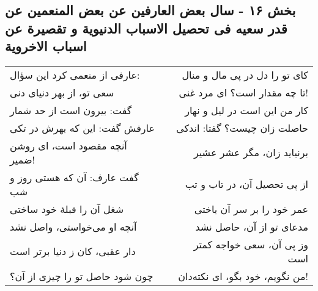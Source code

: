 \begin{center}
\section*{بخش ۱۶ - سال بعض العارفین عن بعض المنعمین عن قدر سعیه فی تحصیل الاسباب الدنیویة و تقصیرة عن اسباب الاخرویة}
\label{sec:016}
\begin{longtable}{l p{0.5cm} r}
عارفی از منعمی کرد این سؤال:
&&
کای تو را دل در پی مال و منال
\\
سعی تو، از بهر دنیای دنی
&&
تا چه مقدار است؟ ای مرد غنی!
\\
گفت: بیرون است از حد شمار
&&
کار من این است در لیل و نهار
\\
عارفش گفت: این که بهرش در تکی
&&
حاصلت زان چیست؟ گفتا: اندکی
\\
آنچه مقصود است، ای روشن ضمیر!
&&
برنیاید زان، مگر عشر عشیر
\\
گفت عارف: آن که هستی روز و شب
&&
از پی تحصیل آن، در تاب و تب
\\
شغل آن را قبلهٔ خود ساختی
&&
عمر خود را بر سر آن باختی
\\
آنچه او می‌خواستی، واصل نشد
&&
مدعای تو از آن، حاصل نشد
\\
دار عقبی، کان ز دنیا برتر است
&&
وز پی آن، سعی خواجه کمتر است
\\
چون شود حاصل تو را چیزی از آن؟
&&
من نگویم، خود بگو، ای نکته‌دان!
\\
\end{longtable}
\end{center}
